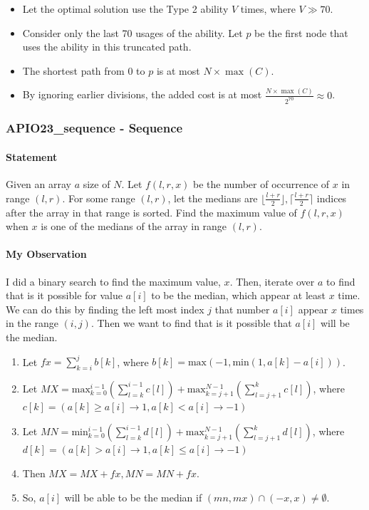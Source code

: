 \begin{itemize}[nosep]
    \item Let the optimal solution use the Type 2 ability $V$ times, where $V \gg 70$.
    \item Consider only the last 70 usages of the ability. Let $p$ be the first node that uses the ability in this truncated path.
    \item The shortest path from $0$ to $p$ is at most $N \times \max(C)$.
    \item By ignoring earlier divisions, the added cost is at most $\frac{N \times \max(C)}{2^{70}} \approx 0$.
\end{itemize}


\subsubsection{APIO23\_sequence - Sequence}


\paragraph{Statement}

Given an array $a$ size of $N$.
Let $f(l, r, x)$ be the number of occurrence of $x$ in range $(l, r)$.
For some range $(l, r)$, let the medians are $\lfloor \frac{l+r}{2} \rfloor, \lceil \frac{l+r}{2} \rceil$ indices after the array in that range is sorted.
Find the maximum value of $f(l, r, x)$ when $x$ is one of the medians of the array in range $(l, r)$.

\paragraph{My Observation}

I did a binary search to find the maximum value, $x$. Then, iterate over $a$ to find that is it possible for value $a[i]$ to be the median, which appear at least $x$ time. We can do this by finding the left most index $j$ that number $a[i]$ appear $x$ times in the range $(i, j)$. Then we want to find that is it possible that $a[i]$ will be the median.
\begin{enumerate}
    \item Let $fx = \sum_{k=i}^{j}b[k]$, where $b[k] = \text{max}(-1, \text{min}(1, a[k] - a[i]))$.
    \item Let $MX = \text{max}_{k=0}^{i-1}\left( \sum_{l=k}^{i-1}c[l]\right) + \text{max}_{k=j+1}^{N-1}\left( \sum_{l=j+1}^{k}c[l]\right)$, where $c[k] = (a[k] \geq a[i] \to 1, a[k] < a[i] \to -1)$
    \item Let $MN = \text{min}_{k=0}^{i-1}\left( \sum_{l=k}^{i-1}d[l]\right) + \text{max}_{k=j+1}^{N-1}\left( \sum_{l=j+1}^{k}d[l]\right)$, where $d[k] = (a[k] > a[i] \to 1, a[k] \leq a[i] \to -1)$
    \item Then $MX = MX + fx, MN = MN + fx$.
    \item So, $a[i]$ will be able to be the median if $(mn, mx) \cap (-x, x) \neq \emptyset$.
\end{enumerate}

